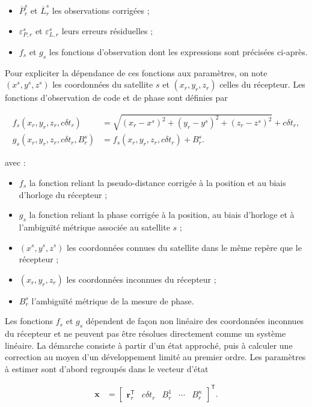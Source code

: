 \begin{itemize}
    \item $\overline P_r^s$ et $\overline L_r^s$ les observations corrigées ;
    \item $\varepsilon_{P,r}^s$ et $\varepsilon_{L,r}^s$ leurs erreurs
    résiduelles ;
    \item $f_s$ et $g_s$ les fonctions d'observation dont les expressions
    sont précisées ci-après.
\end{itemize}


Pour expliciter la dépendance de ces fonctions aux paramètres, on note
$(x^s,y^s,z^s)$ les coordonnées du satellite $s$ et
$(x_r,y_r,z_r)$ celles du récepteur. Les fonctions d'observation de code et de
phase sont définies par

\begin{align}
f_s(x_r,y_r,z_r,c\delta t_r)
&=
\sqrt{(x_r-x^s)^2+(y_r-y^s)^2+(z_r-z^s)^2}
+c\delta t_r,
\label{eq:code_observation_function}
\\
g_s(x_r,y_r,z_r,c\delta t_r,B_r^s)
&=
f_s(x_r,y_r,z_r,c\delta t_r)+B_r^s.
\label{eq:phase_observation_function}
\end{align}

avec :

\begin{itemize}
    \item $f_s$ la fonction reliant la pseudo-distance corrigée à la position et au biais d'horloge du récepteur ;
    \item $g_s$ la fonction reliant la phase corrigée à la position, au biais d'horloge et à l'ambiguïté métrique associée au satellite $s$ ;
    \item $(x^s,y^s,z^s)$ les coordonnées connues du satellite dans le même
    repère que le récepteur ;
    \item $(x_r,y_r,z_r)$ les coordonnées inconnues du récepteur ;
    \item $B_r^s$ l'ambiguïté métrique de la mesure de phase.
\end{itemize}


Les fonctions $f_s$ et $g_s$ dépendent de façon non linéaire des
coordonnées inconnues du récepteur et ne peuvent pas être résolues directement
comme un système linéaire. La démarche consiste à partir d'un état approché,
puis à calculer une correction au moyen d'un développement limité au premier
ordre. Les paramètres à estimer sont d'abord regroupés dans le vecteur d'état

\begin{align}
\mathbf x
&=
\begin{bmatrix}
\mathbf r_r^{\mathsf T} & c\delta t_r & B_r^1 & \cdots & B_r^n
\end{bmatrix}^{\mathsf T}.
\label{eq:static_state_vector}
\end{align}

